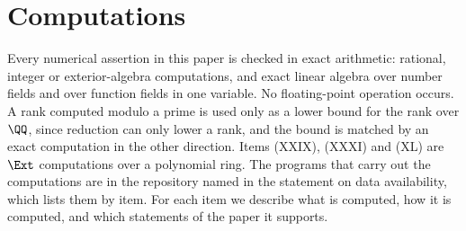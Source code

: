 \section{Computations}\label{sec:verification}

Every numerical assertion in this paper is checked in exact arithmetic:
rational, integer or exterior-algebra computations, and exact linear algebra
over number fields and over function fields in one variable. No
floating-point operation occurs. A rank computed modulo a prime is used only
as a lower bound for the rank over $\QQ$, since reduction can only lower a
rank, and the bound is matched by an exact computation in the other
direction. Items (XXIX), (XXXI) and (XL) are $\Ext$
computations over a polynomial ring. The programs that carry out the
computations are in the repository named in the statement on data
availability, which lists them by item. For each item we describe what is
computed, how it is computed, and which statements of the paper it supports.


